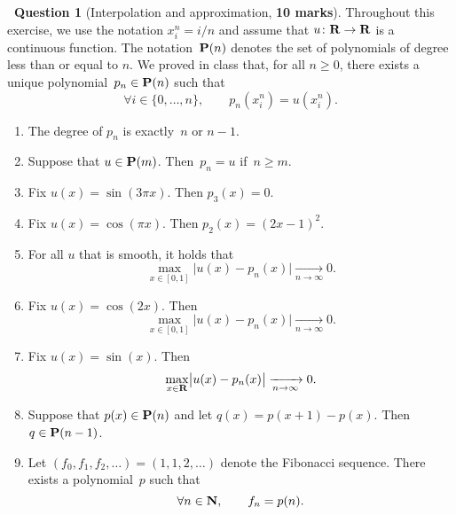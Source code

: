 \documentclass[11pt]{article}
\theoremstyle{definition}
\newtheorem{question}{{\normalfont \faGears}~Question}
\renewcommand{\mymarks}[1]{\textbf{#1 marks}}
\begin{document}
\newpage
\begin{question}
    [Interpolation and approximation, \mymarks{10}]
    Throughout this exercise, we use the notation
    $x^n_i = i/n$ and assume that $u \colon \mathbf R \to \mathbf R$ is a continuous function.
    The notation~$\mathbf P(n)$ denotes the set of polynomials of degree less than or equal to $n$.
    We proved in class that,
    for all $n \geq 0$,
    there exists a unique polynomial~$p_n \in \mathbf P(n)$ such that
    \begin{equation}
        \label{eq:interpolation}
        \forall i \in \{0, \dotsc, n\}, \qquad
        p_n(x^n_i) = u (x^n_i).
    \end{equation}
    \begin{enumerate}
        \item
            The degree of $p_n$ is exactly~$n$ or $n - 1$.

        \item
            Suppose that $u \in \mathbf P(m)$.
            Then~$p_n = u$ if~$n \geq m$.

        \item
            Fix $u(x) = \sin(3\pi x)$. Then $p_3(x) = 0$.

        \item
            Fix $u(x) = \cos(\pi x)$.
            Then $p_2(x) = (2x - 1)^2$.

        \item
            For all $u$ that is smooth,
            it holds that
            \[
                \max_{x \in [0, 1]} \bigl\lvert u(x) - p_n(x) \bigr\rvert \xrightarrow[n \to \infty]{} 0.
            \]

        \item
            Fix $u(x) = \cos(2x)$.
            Then
            \[
                \max_{x \in [0, 1]} \bigl\lvert u(x) - p_n(x) \bigr\rvert \xrightarrow[n \to \infty]{} 0.
            \]

        \item
            Fix $u(x) = \sin(x)$.
            Then
            \[
                \max_{x \in \mathbf R} \bigl\lvert u(x) - p_n(x) \bigr\rvert \xrightarrow[n \to \infty]{} 0.
            \]

        \item
            Suppose that $p(x) \in \mathbf P(n)$ and let $q(x) = p(x+1) - p(x)$. Then $q \in \mathbf P(n-1)$.

        \item
            Let $(f_0, f_1, f_2, \dotsc) = (1, 1, 2, \dotsc)$ denote the Fibonacci sequence.
            There exists a polynomial~$p$ such that
            \begin{equation*}
                \label{eq:fibonacci_polynomial}
                \forall n \in \mathbf N, \qquad
                f_n = p(n).
            \end{equation*}


\end{enumerate}
\end{question}
\end{document}
